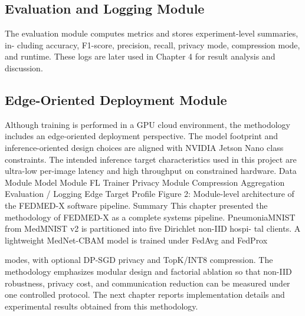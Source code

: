 \documentclass[12pt,a4paper]{report}
\begin{document}
\subsection{Evaluation and Logging Module}
The evaluation module computes metrics and stores experiment-level summaries, in- cluding accuracy, F1-score, precision, recall, privacy mode, compression mode, and runtime. These logs are later used in Chapter 4 for result analysis and discussion.
\subsection{Edge-Oriented Deployment Module}
Although training is performed in a GPU cloud environment, the methodology includes an edge-oriented deployment perspective. The model footprint and inference-oriented design choices are aligned with NVIDIA Jetson Nano class constraints. The intended inference target characteristics used in this project are ultra-low per-image latency and high throughput on constrained hardware.
Data Module
Model Module
FL Trainer
Privacy Module
Compression
Aggregation
Evaluation / Logging
Edge Target Profile
Figure 2: Module-level architecture of the FEDMED-X software pipeline.
Summary
This chapter presented the methodology of FEDMED-X as a complete systems pipeline.
PneumoniaMNIST from MedMNIST v2 is partitioned into five Dirichlet non-IID hospi- tal clients. A lightweight MedNet-CBAM model is trained under FedAvg and FedProx

modes, with optional DP-SGD privacy and TopK/INT8 compression. The methodology emphasizes modular design and factorial ablation so that non-IID robustness, privacy cost, and communication reduction can be measured under one controlled protocol.
The next chapter reports implementation details and experimental results obtained from this methodology.
\end{document}
